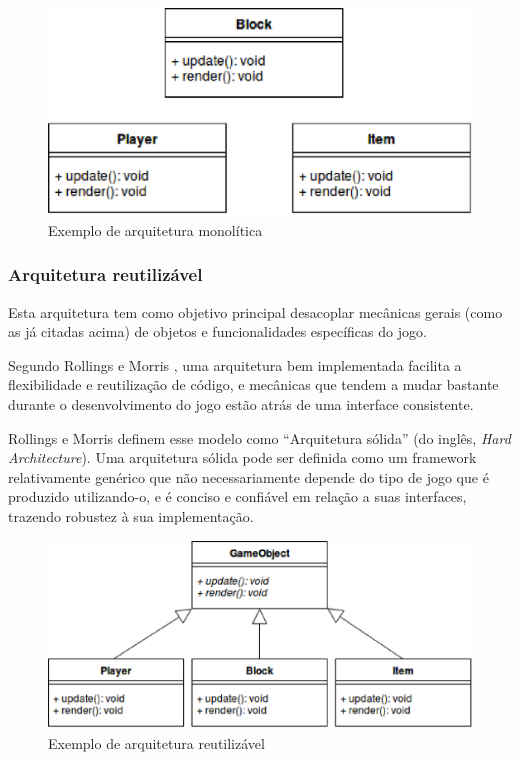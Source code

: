 \begin{figure}[H]
 \centering \includegraphics[keepaspectratio=true,scale=0.6]{figuras/monolithic-architecture.eps}
   \caption{Exemplo de arquitetura monolítica}
   \label{arch-monolitica}
\end{figure}

\subsubsection{Arquitetura reutilizável}

Esta arquitetura tem como objetivo principal desacoplar mecânicas gerais (como as já citadas acima) de objetos e funcionalidades específicas do jogo.

Segundo Rollings e Morris \cite{rollings2004game}, uma arquitetura bem implementada facilita a flexibilidade e reutilização de código, e mecânicas que tendem a mudar bastante durante o desenvolvimento do jogo estão atrás de uma interface consistente.

Rollings e Morris \cite{rollings2004game} definem esse modelo como “Arquitetura sólida” (do inglês, \textit{Hard Architecture}). Uma arquitetura sólida pode ser definida como um framework relativamente genérico que não necessariamente depende do tipo de jogo que é produzido utilizando-o, e é conciso e confiável em relação a suas interfaces, trazendo robustez à sua implementação.

\begin{figure}[H]
 \centering \includegraphics[keepaspectratio=true,scale=0.6]{figuras/reusable-architecture.eps}
   \caption{Exemplo de arquitetura reutilizável}
   \label{arch-reutilizavel}
\end{figure}

